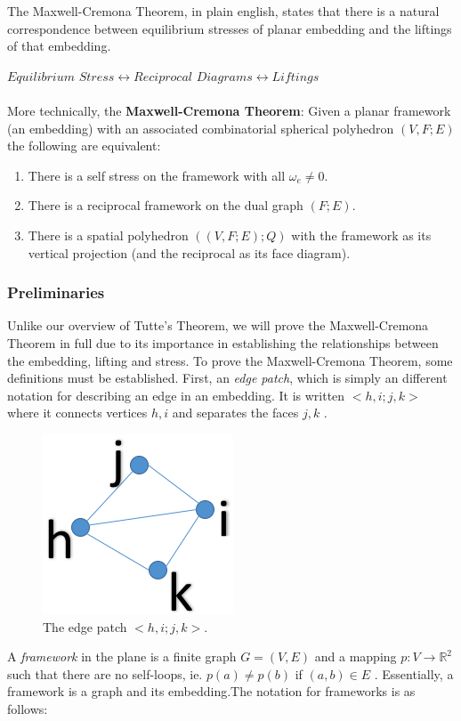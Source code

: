 \documentclass[11pt]{article}
\newcommand{\R}{\mathbb{R}}
\theoremstyle{definition}
\begin{document}
 The Maxwell-Cremona Theorem, in plain english, states that there is a natural correspondence between equilibrium stresses of planar embedding and the liftings of that embedding.
 
 $Equilibrium$  $Stress \leftrightarrow Reciprocal$ $Diagrams \leftrightarrow Liftings$ \\
\\
More technically, the \textbf{Maxwell-Cremona Theorem}: Given a planar framework (an embedding) with an associated combinatorial spherical polyhedron $(V,F;E)$ the following are equivalent:
\begin{enumerate}
	\item There is a self stress on the framework with all $\omega_e \neq 0$.
	\item There is a reciprocal framework on the dual graph $(F;E)$.
	\item There is a spatial polyhedron $((V,F;E);Q)$ with the framework as its vertical projection (and the reciprocal as its face diagram).
 \end{enumerate}

 
\subsubsection{Preliminaries}
Unlike our overview of Tutte's Theorem, we will prove the Maxwell-Cremona Theorem in full due to its importance in establishing the relationships between the embedding, lifting and stress. To prove the Maxwell-Cremona Theorem, some definitions must be established. First, an \emph{edge patch}, which is simply an different notation for describing an edge in an embedding. It is written $<h,i;j,k>$ where it connects vertices $h,i$ and separates the faces $j,k$ \cite{mccProof}.

\begin{figure}
  \begin{center}
  		\includegraphics[width=.23\textwidth]{edge_patch2}
  \end{center}
  \caption{The edge patch $<h,i;j,k>$.}
\end{figure}
  
A \emph{framework} in the plane is a finite graph $G=(V,E)$ and a mapping $p: V \rightarrow \R^2$ such that there are no self-loops, ie. $p(a) \neq p(b)$ if $(a,b) \in E$ \cite{mccProof}. Essentially, a framework is a graph and its embedding.The notation for frameworks is as follows: 
\end{document}
